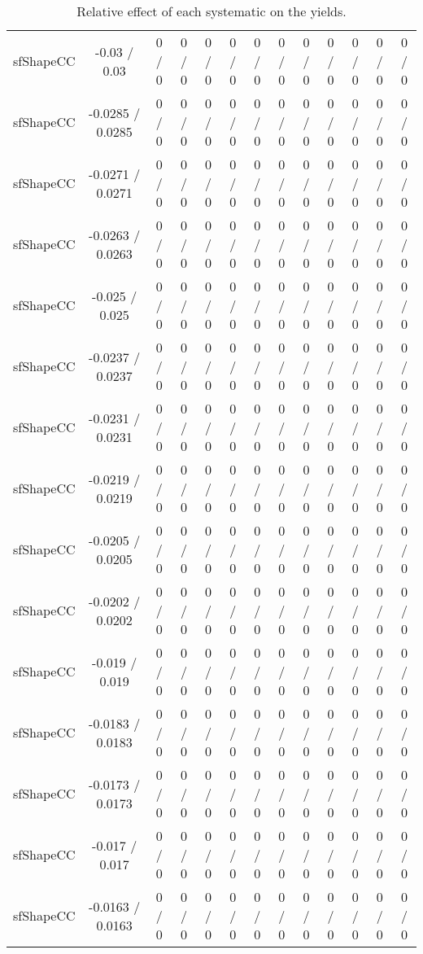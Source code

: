 \documentclass[10pt]{article}
\begin{document}
\begin{table}[htbp]
\begin{center}
\begin{tabular}{|c|c|c|c|c|c|c|c|c|c|c|c|c|}
  sfShapeCC & -0.03 / 0.03 & 0 / 0 & 0 / 0 & 0 / 0 & 0 / 0 & 0 / 0 & 0 / 0 & 0 / 0 & 0 / 0 & 0 / 0 & 0 / 0 & 0 / 0 \\ 
  sfShapeCC & -0.0285 / 0.0285 & 0 / 0 & 0 / 0 & 0 / 0 & 0 / 0 & 0 / 0 & 0 / 0 & 0 / 0 & 0 / 0 & 0 / 0 & 0 / 0 & 0 / 0 \\ 
  sfShapeCC & -0.0271 / 0.0271 & 0 / 0 & 0 / 0 & 0 / 0 & 0 / 0 & 0 / 0 & 0 / 0 & 0 / 0 & 0 / 0 & 0 / 0 & 0 / 0 & 0 / 0 \\ 
  sfShapeCC & -0.0263 / 0.0263 & 0 / 0 & 0 / 0 & 0 / 0 & 0 / 0 & 0 / 0 & 0 / 0 & 0 / 0 & 0 / 0 & 0 / 0 & 0 / 0 & 0 / 0 \\ 
  sfShapeCC & -0.025 / 0.025 & 0 / 0 & 0 / 0 & 0 / 0 & 0 / 0 & 0 / 0 & 0 / 0 & 0 / 0 & 0 / 0 & 0 / 0 & 0 / 0 & 0 / 0 \\ 
  sfShapeCC & -0.0237 / 0.0237 & 0 / 0 & 0 / 0 & 0 / 0 & 0 / 0 & 0 / 0 & 0 / 0 & 0 / 0 & 0 / 0 & 0 / 0 & 0 / 0 & 0 / 0 \\ 
  sfShapeCC & -0.0231 / 0.0231 & 0 / 0 & 0 / 0 & 0 / 0 & 0 / 0 & 0 / 0 & 0 / 0 & 0 / 0 & 0 / 0 & 0 / 0 & 0 / 0 & 0 / 0 \\ 
  sfShapeCC & -0.0219 / 0.0219 & 0 / 0 & 0 / 0 & 0 / 0 & 0 / 0 & 0 / 0 & 0 / 0 & 0 / 0 & 0 / 0 & 0 / 0 & 0 / 0 & 0 / 0 \\ 
  sfShapeCC & -0.0205 / 0.0205 & 0 / 0 & 0 / 0 & 0 / 0 & 0 / 0 & 0 / 0 & 0 / 0 & 0 / 0 & 0 / 0 & 0 / 0 & 0 / 0 & 0 / 0 \\ 
  sfShapeCC & -0.0202 / 0.0202 & 0 / 0 & 0 / 0 & 0 / 0 & 0 / 0 & 0 / 0 & 0 / 0 & 0 / 0 & 0 / 0 & 0 / 0 & 0 / 0 & 0 / 0 \\ 
  sfShapeCC & -0.019 / 0.019 & 0 / 0 & 0 / 0 & 0 / 0 & 0 / 0 & 0 / 0 & 0 / 0 & 0 / 0 & 0 / 0 & 0 / 0 & 0 / 0 & 0 / 0 \\ 
  sfShapeCC & -0.0183 / 0.0183 & 0 / 0 & 0 / 0 & 0 / 0 & 0 / 0 & 0 / 0 & 0 / 0 & 0 / 0 & 0 / 0 & 0 / 0 & 0 / 0 & 0 / 0 \\ 
  sfShapeCC & -0.0173 / 0.0173 & 0 / 0 & 0 / 0 & 0 / 0 & 0 / 0 & 0 / 0 & 0 / 0 & 0 / 0 & 0 / 0 & 0 / 0 & 0 / 0 & 0 / 0 \\ 
  sfShapeCC & -0.017 / 0.017 & 0 / 0 & 0 / 0 & 0 / 0 & 0 / 0 & 0 / 0 & 0 / 0 & 0 / 0 & 0 / 0 & 0 / 0 & 0 / 0 & 0 / 0 \\ 
  sfShapeCC & -0.0163 / 0.0163 & 0 / 0 & 0 / 0 & 0 / 0 & 0 / 0 & 0 / 0 & 0 / 0 & 0 / 0 & 0 / 0 & 0 / 0 & 0 / 0 & 0 / 0 \\ 
\hline 
\end{tabular} 
\caption{Relative effect of each systematic on the yields.} 
\end{center} 
\end{table} 
\end{document}
